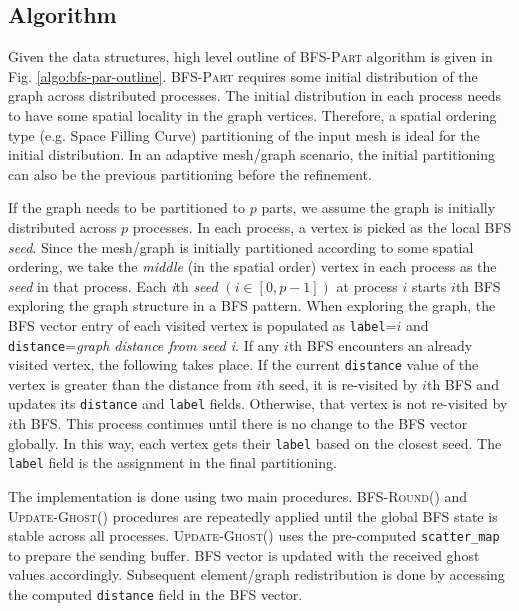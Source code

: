\documentclass[conference]{IEEEtran}
\newcommand{\bfspart}{\textsc{BFS-Part}\xspace}
\begin{document}
\subsection{Algorithm}
Given the data structures, high level outline of \bfspart algorithm is given in Fig. \ref{algo:bfs-par-outline}. \bfspart requires some initial distribution of the graph across distributed processes. The initial distribution in each process needs to have some spatial locality in the graph vertices. Therefore, a spatial ordering type (e.g. Space Filling Curve) partitioning of the input mesh is ideal for the initial distribution. In an adaptive mesh/graph scenario, the initial partitioning can also be the previous partitioning before the refinement. 
\par
If the graph needs to be partitioned to $p$ parts, we assume the graph is initially distributed across $p$ processes. In each process, a vertex is picked as the local BFS \emph{seed}. Since the mesh/graph is initially partitioned according to some spatial ordering, we take the \emph{middle} (in the spatial order) vertex in each process as the \emph{seed} in that process. Each \emph{i}th \emph{seed} $(i \in [0, p-1])$ at process $i$ starts $i$th BFS exploring the graph structure in a BFS pattern. When exploring the graph, the BFS vector entry of each visited vertex is populated as \verb|label|=$i$ and \verb|distance|=\emph{graph distance from seed i}. If any $i$th BFS encounters an already visited vertex, the following takes place. If the current \verb|distance| value of the vertex is greater than the distance from $i$th seed, it is re-visited by $i$th BFS and updates its \verb|distance| and \verb|label| fields. Otherwise, that vertex is not re-visited by $i$th BFS. This process continues until there is no change to the BFS vector globally. In this way, each vertex gets their \verb|label| based on the closest seed. The \verb|label| field is the assignment in the final partitioning.
\par
The implementation is done using two main procedures. \textsc{BFS-Round()} and \textsc{Update-Ghost()} procedures are repeatedly applied until the global BFS state is stable across all processes. \textsc{Update-Ghost()} uses the pre-computed \verb|scatter_map| to prepare the sending buffer. BFS vector is updated with the received ghost values accordingly. Subsequent element/graph redistribution is done by accessing the computed \verb|distance| field in the BFS vector.
\end{document}
